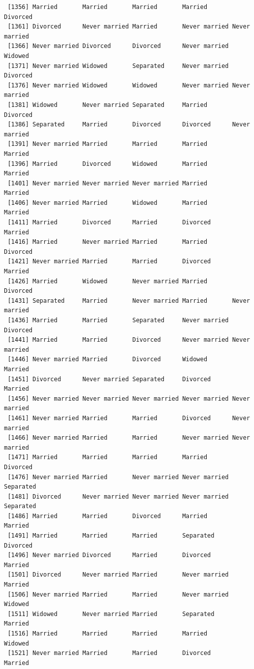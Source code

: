 \documentclass[
  letterpaper,
  DIV=11,
  numbers=noendperiod,
  oneside]{scrartcl}
\begin{document}
\begin{verbatim}
 [1356] Married       Married       Married       Married       Divorced     
 [1361] Divorced      Never married Married       Never married Never married
 [1366] Never married Divorced      Divorced      Never married Widowed      
 [1371] Never married Widowed       Separated     Never married Divorced     
 [1376] Never married Widowed       Widowed       Never married Never married
 [1381] Widowed       Never married Separated     Married       Divorced     
 [1386] Separated     Married       Divorced      Divorced      Never married
 [1391] Never married Married       Married       Married       Married      
 [1396] Married       Divorced      Widowed       Married       Married      
 [1401] Never married Never married Never married Married       Married      
 [1406] Never married Married       Widowed       Married       Married      
 [1411] Married       Divorced      Married       Divorced      Married      
 [1416] Married       Never married Married       Married       Divorced     
 [1421] Never married Married       Married       Divorced      Married      
 [1426] Married       Widowed       Never married Married       Divorced     
 [1431] Separated     Married       Never married Married       Never married
 [1436] Married       Married       Separated     Never married Divorced     
 [1441] Married       Married       Divorced      Never married Never married
 [1446] Never married Married       Divorced      Widowed       Married      
 [1451] Divorced      Never married Separated     Divorced      Married      
 [1456] Never married Never married Never married Never married Never married
 [1461] Never married Married       Married       Divorced      Never married
 [1466] Never married Married       Married       Never married Never married
 [1471] Married       Married       Married       Married       Divorced     
 [1476] Never married Married       Never married Never married Separated    
 [1481] Divorced      Never married Never married Never married Separated    
 [1486] Married       Married       Divorced      Married       Married      
 [1491] Married       Married       Married       Separated     Divorced     
 [1496] Never married Divorced      Married       Divorced      Married      
 [1501] Divorced      Never married Married       Never married Married      
 [1506] Never married Married       Married       Never married Widowed      
 [1511] Widowed       Never married Married       Separated     Married      
 [1516] Married       Married       Married       Married       Widowed      
 [1521] Never married Married       Married       Divorced      Married      

\end{verbatim}
\end{document}
